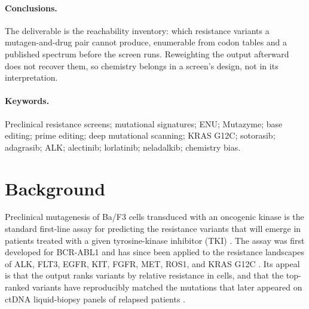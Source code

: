 \documentclass[11pt,a4paper]{article}
\begin{document}
\paragraph{Conclusions.}
The deliverable is the reachability inventory: which resistance
variants a mutagen-and-drug pair cannot produce, enumerable from codon
tables and a published spectrum before the screen runs. Reweighting the
output afterward does not recover them, so chemistry belongs in a
screen's design, not in its interpretation.


\paragraph{Keywords.}
Preclinical resistance screens; mutational signatures; ENU; Mutazyme;
base editing; prime editing; deep mutational scanning; KRAS G12C;
sotorasib; adagrasib; ALK; alectinib; lorlatinib; neladalkib; chemistry
bias.

\section{Background}

Preclinical mutagenesis of Ba/F3 cells transduced with an
oncogenic kinase is the standard first-line assay for predicting the
resistance variants that will emerge in patients treated with a given
tyrosine-kinase inhibitor (TKI)
\citep{warmuth2007,doi2022,koga2021,tang2022boehringer}. The assay was
first developed for BCR-ABL1 and has since been applied to the resistance
landscapes of ALK, FLT3, EGFR, KIT, FGFR, MET, ROS1, and KRAS G12C
\citep{bradeen2006,azam2003,doi2022,takei2025,tang2022boehringer,tanaka2021,awad2021,feng2022,oh2026,tiedt2011,keddy2022}.
Its appeal is that the output ranks variants by relative resistance
in cells, and that the top-ranked variants have reproducibly matched
the mutations that later appeared on ctDNA liquid-biopsy panels of relapsed patients
\citep{tanaka2021,awad2021}.
\end{document}
